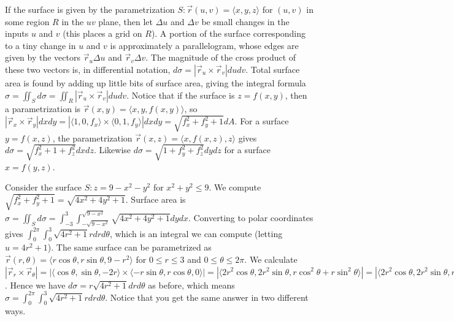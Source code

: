 If the surface is given by the parametrization $S:\vec
r(u,v)=\langle x,y,z\rangle$ for $(u,v)$ in some region $R$ in the $uv$
plane, then let $\Delta u$ and $\Delta v$ be small changes in the inputs $u$ and
$v$ (this places a grid on $R$). A portion of the surface
corresponding to a tiny change in $u$ and $v$ is approximately a
parallelogram, whose edges are given by the vectors $\vec r_u \Delta u$ and
$\vec r_v\Delta v$. The magnitude of the cross product of these two vectors
is, in differential notation, $d\sigma = |\vec r_u\times \vec r_v|dudv $. Total
surface area is found by adding up little bits of surface area, giving
the integral formula $\sigma=\iint_S d\sigma = \iint_R |\vec r_u\times \vec
r_v|dudv$. Notice that if the surface is $z=f(x,y)$, then a
parametrization is $\vec r(x,y)=\langle x,y,f(x,y)\rangle$, so $|\vec
r_x\times \vec r_y|dxdy = |\langle1,0,f_x\rangle\times \langle0,1,f_y\rangle|dxdy
= \sqrt{f_x^2+f_y^2+1} dA$.  For a surface $y=f(x,z)$, the
parametrization $\vec r(x,z)=\langle x,f(x,z),z\rangle$ gives $d\sigma =
\sqrt{f_x^2+1+f_z^2} dxdz$. Likewise $d\sigma = \sqrt{1+f_y^2+f_z^2} dydz$
for a surface $x=f(y,z)$.

\begin{example}
  Consider the surface $S:z=9-x^2-y^2$ for $x^2+y^2\leq 9$. We compute
  $\sqrt{f_x^2+f_y^2+1} = \sqrt{4x^2+4y^2+1}$. Surface area is
  $\sigma=\iint_S d\sigma = \int_{-3}^{3}\int_{-\sqrt{9-x^2}}^{\sqrt{9-x^2}}
  \sqrt{4x^2+4y^2+1} dydx$. Converting to polar coordinates gives
  $\int_{0}^{2\pi}\int_{0}^{3} \sqrt{4r^2+1}r drd\theta$, which is an integral we
  can compute (letting $u=4r^2+1$). The same surface can be
  parametrized as $\vec r(r,\theta) = \langle r\cos \theta,r\sin \theta, 9-r^2\rangle$
  for $0\leq r\leq 3$ and $0\leq \theta \leq 2\pi$. We calculate $|\vec r_r\times \vec r_\theta| =
  |\langle\cos \theta,\sin \theta, -2r\rangle\times \langle-r\sin \theta,r\cos \theta, 0\rangle|
  = |\langle2r^2\cos \theta, 2r^2\sin \theta, r\cos^2
    \theta+r\sin^2\theta\rangle|=|\langle2r^2\cos \theta, 2r^2\sin \theta,r\rangle| =
  \sqrt{4r^4+r^2} = r\sqrt{4r^2+1}$.  Hence we have $d\sigma =
  r\sqrt{4r^2+1}drd\theta$ as before, which means $\sigma = \int_{0}^{2\pi}\int_{0}^{3}
  \sqrt{4r^2+1}r drd\theta$. Notice that you get the same answer in two
  different ways.
\end{example}


